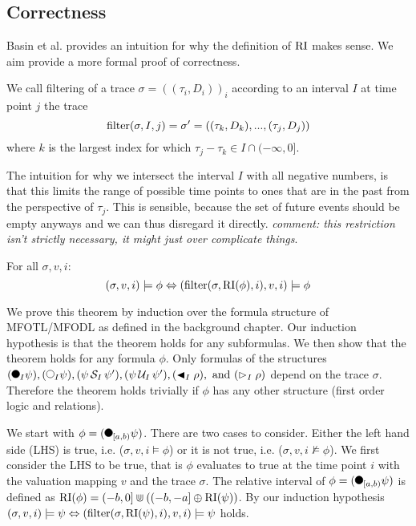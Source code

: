 \subsection{Correctness}
Basin et al. \cite{Basin2016} provides an intuition for why the definition of $\operatorname{RI}$ makes sense.
We aim provide a more formal proof of correctness.
\begin{definition}
    We call filtering of a trace $\sigma=((\tau_i,D_i))_i$ according to an interval $I$ at time point $j$ the trace 
    \begin{equation*}
        \operatorname{filter}(\sigma, I, j) = \sigma' = ((\tau_k,D_k), ..., (\tau_j,D_j))
    \end{equation*}
    where $k$ is the largest index for which $\tau_j - \tau_k \in I \cap (-\infty,0]$.
\end{definition}
The intuition for why we intersect the interval $I$ with all negative numbers, is that this limits the range of possible time points to ones that are in the past from the perspective of $\tau_j$.
This is sensible, because the set of future events should be empty anyways and we can thus disregard it directly.
\textit{comment: this restriction isn't strictly necessary, it might just over complicate things}.
\begin{theorem}
    For all  $\sigma, v, i$:
    \begin{equation*}
        (\sigma, v, i) \models \phi 
        \Leftrightarrow (\operatorname{filter}(\sigma, \operatorname{RI}(\phi), i), v, i) \models \phi
    \end{equation*}
\end{theorem}
We prove this theorem by induction over the formula structure of MFOTL/MFODL as defined in the background chapter.
Our induction hypothesis is that the theorem holds for any subformulas.
We then show that the theorem holds for any formula $\phi$.
Only formulas of the structures $(\Previous{I} \psi),(\Next{I} \psi), (\psi \Since{I} \psi'), (\psi \Until{I} \psi'), (\Pregex{I} \rho), \text{ and } (\Fregex{I} \rho)$ depend on the trace $\sigma$.
Therefore the theorem holds trivially if $\phi$ has any other structure (first order logic and relations).

We start with $\phi = (\Previous{[a,b)} \psi)$.
There are two cases to consider.
Either the left hand side (LHS) is true, i.e. ($\sigma, v, i \models \phi$) or it is not true, i.e. ($\sigma, v, i \not\models \phi$).
We first consider the LHS to be true, that is $\phi$ evaluates to true at the time point $i$ with the valuation mapping $v$ and the trace $\sigma$.
The relative interval of $\phi=(\Previous{[a,b)} \psi)$ is defined as $\operatorname{RI}(\phi) = (-b,0] \Cup ((-b,-a] \oplus \operatorname{RI}(\psi))$.
By our induction hypothesis $ (\sigma, v, i) \models \psi \Leftrightarrow (\operatorname{filter}(\sigma, \operatorname{RI}(\psi), i), v, i) \models \psi $ holds.



